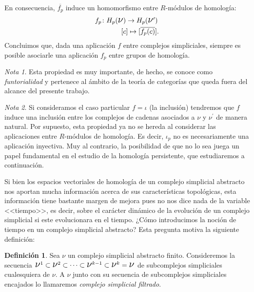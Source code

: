 \documentclass[12pt, a4paper, twoside]{book}
\numberwithin{equation}{section}
\theoremstyle{definition}
\newtheorem{defi}{Definición}[section]
\theoremstyle{remark}
\newtheorem*{remark}{Nota}
\theoremstyle{plain}
\begin{document}
	En consecuencia, $\overline{f_{p}}$ induce un 
	homomorfismo entre $R$-módulos de homología:	
		\begin{align*}
			\left.
			\begin{array}{l}
				f_{p}\colon H_{p}(\text{{\Large $\nu$}})
				\rightarrow 
				H_{p}(\text{{\Large $\nu$}}')\\[3pt] 
				\hspace{1.35cm} [c] \mapsto [\overline{f_{p}
				(c)}].
			\end{array}
			\right.
		\end{align*}
	Concluimos que, dada una aplicación $f$ entre complejos simpliciales, 
	siempre es posible asociarle una aplicación $f_{p}$ entre grupos de 
	homología.
	
	\begin{remark}
		Esta propiedad es muy importante, de hecho, se conoce como 
		\emph{funtorialidad} y pertenece al ámbito de la teoría de 
		categorías que queda fuera del alcance del presente trabajo. 
	\end{remark}
	
	\begin{remark}
		Si consideramos el caso particular $f=\iota$ (la inclusión) 
		tendremos que $f$ induce una inclusión entre los complejos de 
		cadenas asociados a {\Large $\nu$} y 
		{\Large $\nu$}$^{\prime}$ de manera natural. Por supuesto, 
		esta propiedad ya no se hereda al considerar las aplicaciones 
		entre $R$-módulos de homología. Es decir, $\iota_{p}$ no es 
		necesariamente una aplicación inyectiva. Muy al contrario, 
		la posibilidad de que no lo sea juega un papel fundamental en 
		el estudio de la homología persistente, que estudiaremos a 
		continuación.	
	\end{remark}

	Si bien los espacios vectoriales de homología de un complejo 
	simplicial abstracto nos aportan mucha información acerca de sus 
	características topológicas, esta información tiene bastante margen de 
	mejora pues no nos dice nada de la variable <<tiempo>>, es decir, 
	sobre el carácter dinámico de la evolución de un complejo simplicial 
	si este evolucionara en el tiempo. ¿Cómo 
	introducimos la noción de tiempo en un complejo simplicial abstracto? 
	Esta pregunta motiva la siguiente definición:

	\begin{defi}
		Sea {\Large $\nu$} un complejo simplicial abstracto finito. 
		Consideremos la secuencia $ \text{{\Large $\nu$}$^{1}$} 
		\subset \text{{\Large $\nu$}$^{2}$} \subset \cdots \subset
		\text{{\Large $\nu$}$^{k-1}$} \subset 
		\text{{\Large $\nu$}$^{k}$} = \text{{\Large $\nu$}}$ de 
		subcomplejos simpliciales cualesquiera de {\Large $\nu$}. A
		{\Large $\nu$} junto con su secuencia de subcomplejos 
		simpliciales encajados lo llamaremos \textit{complejo 
		simplicial filtrado}. 
	\end{defi}
\end{document}
